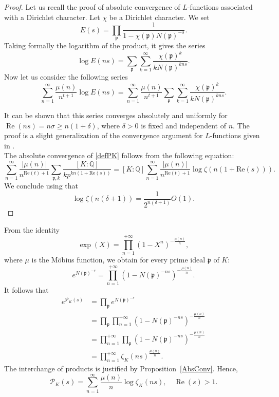 \documentclass[12pt]{amsart}
\newcommand{\Q}{\mathbb{Q}}
\begin{document}
\begin{proof} Let us recall the proof of absolute convergence of $L$-functions associated with a Dirichlet character.  Let $\chi$ be a Dirichlet character. We set \[ E(s) = \prod_{\mathfrak{p}} \frac{1}{1 - \chi(\mathfrak{p}) N(\mathfrak{p})^{-s}}. \]
Taking formally the logarithm of the product, it gives the series
\[ \log E(ns) = \sum_{\mathfrak{p}} \sum_{k=1}^{\infty} \frac{\chi(\mathfrak{p})^k}{k N(\mathfrak{p})^{kns}}. \]
Now let us consider the following series
\[
\sum_{n=1}^\infty \frac{\mu(n)}{n^{t+1}}\log E(ns)=\sum_{n=1}^\infty \frac{\mu(n)}{n^{t+1}}
\sum_{\mathfrak{p}} \sum_{k=1}^{\infty} \frac{\chi(\mathfrak{p})^k}{k N(\mathfrak{p})^{kns}}.
\]


It can be shown that this series converges absolutely and uniformly for $\operatorname{Re}(ns) = n\sigma \geq n(1 + \delta)$, where $\delta > 0$ is fixed and independent of $n$. The proof is a slight generalization of the convergence argument for $L$-functions given in \cite{Neukirch}.\\


The absolute convergence of \eqref{defPK} follows from the  following equation: 
\[ \sum_{n=1}^\infty \frac{|\mu(n)|}{n^{\mathrm{Re}(t)+1}}
\sum_{\mathfrak{p}, k} \frac{[K:\Q]}{kp^{kn(1+\mathrm{Re}(s))}} = [K:\Q] 
 \sum_{n=1}^\infty \frac{|\mu(n)|}{n^{\mathrm{Re}(t)+1}}
\log \zeta(n(1+\mathrm{Re}(s))). \]
We conclude using that
\[
\log\zeta(n(\delta+1))=\frac{1}{2^{n(\delta+1)}}O(1).
\]


\end{proof}
From the identity
\[
\exp(X) = \prod_{n=1}^{+\infty} (1 - X^n)^{-\frac{\mu(n)}{n}},
\]
where $\mu$ is the M\"obius function, we obtain for every prime ideal $\mathfrak{p}$ of $K$:
\[
e^{N(\mathfrak{p})^{-s}} = \prod_{n=1}^{+\infty} (1 - N(\mathfrak{p})^{-ns})^{-\frac{\mu(n)}{n}}.
\]
It follows that
\[
\begin{split}
e^{\mathcal{P}_K(s)} &= \prod_{\mathfrak{p}} e^{N(\mathfrak{p})^{-s}} \\
&= \prod_{\mathfrak{p}} \prod_{n=1}^{+\infty} (1 - N(\mathfrak{p})^{-ns})^{-\frac{\mu(n)}{n}} \\
&= \prod_{n=1}^{+\infty} \prod_{\mathfrak{p}} (1 - N(\mathfrak{p})^{-ns})^{-\frac{\mu(n)}{n}} \\
&= \prod_{n=1}^{+\infty} \zeta_K(ns)^{\frac{\mu(n)}{n}}.
\end{split}
\]
The interchange of products is justified by Proposition~\ref{AbsConv}. Hence,
\[
\mathcal{P}_K(s) = \sum_{n=1}^\infty \frac{\mu(n)}{n} \log \zeta_K(ns), \quad \operatorname{Re}(s) > 1.
\]
\end{document}
